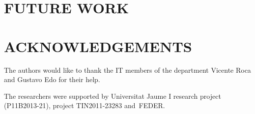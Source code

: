 \documentclass[a4paper,twoside]{article}
\begin{document}
\section{\uppercase{Future work}}
\label{sec:future}


\section*{\uppercase{Acknowledgements}}
The authors would like to thank the IT members of the department Vicente Roca and Gustavo Edo for their help.

The researchers were supported by Universitat Jaume I research project (P11B2013-21), project
TIN2011-23283 and~FEDER.


{\small
}
\end{document}
